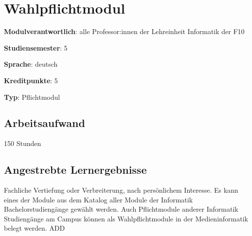 \hypertarget{wahlpflichtmodulpathlabelmi-2017modulbeschreibungen-bachelorba_wpf}{%
\chapter{Wahlpflichtmodul\label{/mi-2017/modulbeschreibungen-bachelor/BA_WPF}}\label{wahlpflichtmodulpathlabelmi-2017modulbeschreibungen-bachelorba_wpf}}

\begin{modulHead}
\textbf{Modulverantwortlich}: alle Professor:innen
der Lehreinheit Informatik der
F10
\end{modulHead}
\begin{modulHead}
\textbf{Studiensemester}:
5
\end{modulHead}
\begin{modulHead}
\textbf{Sprache}:
deutsch
\end{modulHead}
\begin{modulHead}
\textbf{Kreditpunkte}:
5
\end{modulHead}
\begin{modulHead}
\textbf{Typ}:
Pflichtmodul
\end{modulHead}


\hypertarget{arbeitsaufwandpathlabelmi-2017modulbeschreibungen-bachelorba_wpf}{%
\section*{Arbeitsaufwand\label{/mi-2017/modulbeschreibungen-bachelor/BA_WPF}}\label{arbeitsaufwandpathlabelmi-2017modulbeschreibungen-bachelorba_wpf}}

150 Stunden

\hypertarget{angestrebte-lernergebnissepathlabelmi-2017modulbeschreibungen-bachelorba_wpf}{%
\section*{Angestrebte
Lernergebnisse\label{/mi-2017/modulbeschreibungen-bachelor/BA_WPF}}\label{angestrebte-lernergebnissepathlabelmi-2017modulbeschreibungen-bachelorba_wpf}}

Fachliche Vertiefung oder Verbreiterung, nach persönlichem Interesse. Es
kann eines der Module aus dem Katalog aller Module der Informatik
Bachelorstudiengänge gewählt werden. Auch Pflichtmodule anderer
Informatik Studiengänge am Campus können als Wahlpflichtmodule in der
Medieninformatik belegt werden. ADD
